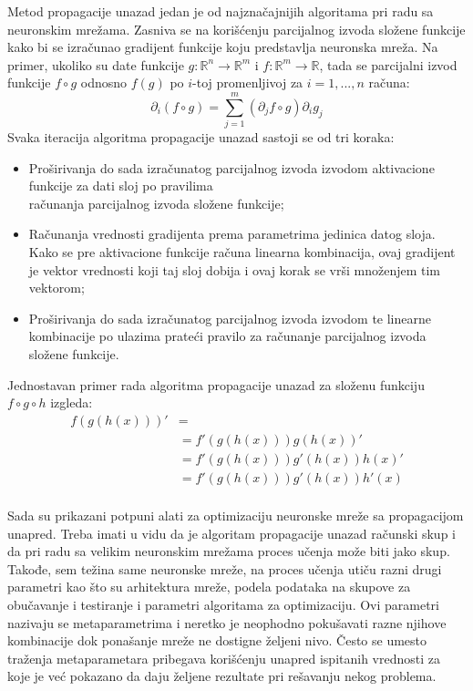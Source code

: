 Metod propagacije unazad jedan je od najznačajnijih algoritama pri radu sa neuronskim mrežama. Zasniva se na korišćenju parcijalnog izvoda složene funkcije kako bi se izračunao gradijent funkcije koju predstavlja neuronska mreža. Na primer, ukoliko su date funkcije $g: \mathbb{R}^n \rightarrow \mathbb{R}^m$ i $f: \mathbb{R}^m \rightarrow \mathbb{R}$, tada se parcijalni izvod funkcije $f \circ g $ odnosno $f(g)$ po $i$-toj promenljivoj za $i=1,...,n$ računa:
\begin{equation}
	\partial_i (f \circ g) = \sum_{j=1}^{m} (\partial_j f \circ g) \partial_i g_j 
\end{equation}
Svaka iteracija algoritma propagacije unazad sastoji se od tri koraka:
\begin{itemize}
	\item Proširivanja do sada izračunatog parcijalnog izvoda izvodom aktivacione funkcije za dati sloj po pravilima \\računanja parcijalnog izvoda složene funkcije;
	\item Računanja vrednosti gradijenta prema parametrima jedinica datog sloja. Kako se pre aktivacione funkcije računa linearna kombinacija, ovaj gradijent je vektor vrednosti koji taj sloj dobija i ovaj korak se vrši množenjem tim vektorom;
	\item Proširivanja do sada izračunatog parcijalnog izvoda izvodom te linearne kombinacije po ulazima prateći pravilo za računanje parcijalnog izvoda složene funkcije.
\end{itemize}

Jednostavan primer rada algoritma propagacije unazad za složenu funkciju $f \circ g \circ h$ izgleda:
\begin{equation}
	\begin{aligned}
		f(g(h(x)))' &= \\
		&= f'(g(h(x)))g(h(x))' \\ 
		&= f'(g(h(x)))g'(h(x))h(x)' \\ 
		&= f'(g(h(x)))g'(h(x))h'(x) \\
	\end{aligned}
\end{equation}

Sada su prikazani potpuni alati za optimizaciju neuronske mreže sa propagacijom unapred. Treba imati u vidu da je algoritam propagacije unazad računski skup i da pri radu sa velikim neuronskim mrežama proces učenja može biti jako skup. Takođe, sem težina same neuronske mreže, na proces učenja utiču razni drugi parametri kao što su arhitektura mreže, podela podataka na skupove za obučavanje i testiranje i parametri algoritama za optimizaciju. Ovi parametri nazivaju se metaparametrima i neretko je neophodno pokušavati razne njihove kombinacije dok ponašanje mreže ne dostigne željeni nivo. Često se umesto traženja metaparametara pribegava korišćenju unapred ispitanih vrednosti za koje je već pokazano da daju željene rezultate pri rešavanju nekog problema.

